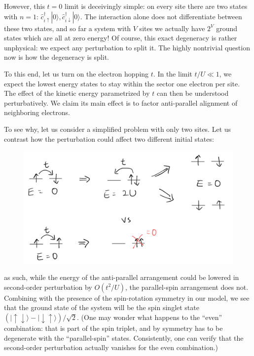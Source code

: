 However, this $t=0$ limit is deceivingly simple: on every site there are two states with $n=1$: $\hat{c}_{i\uparrow}^{\dagger}|0\rangle ,\hat{c}_{i\downarrow}^{\dagger}|0\rangle$. The interaction alone does not differentiate between these two states, and so far a system with $V$ sites we actually have $2^V$ ground states which are all at zero energy! Of course, this exact degeneracy is rather unphysical: we expect any perturbation to split it. The highly nontrivial question now is how the degeneracy is split.

To this end, let us turn on the electron hopping $t$. In the limit $t/U\ll 1$, we expect the lowest energy states to stay within the sector one electron per site. The effect of the kinetic energy parametrized by $t$ can then be understood perturbatively. We claim its main effect is to factor anti-parallel alignment of neighboring electrons.

To see why, let us consider a simplified problem with only two sites. Let us contrast how the perturbation could affect two different initial states:
\begin{figure}[H]
    \centering
    \includegraphics[width=\textwidth]{jupyterbook/data/fig/lec25-fig03.png}
\end{figure}
as such, while the energy of the anti-parallel arrangement could be lowered in second-order perturbation by $O(t^2/U)$, the parallel-spin arrangement does not. Combining with the presence of the spin-rotation symmetry in our model, we see that the ground state of the system will be the spin singlet state $\left( |\uparrow \downarrow \rangle -|\downarrow \uparrow \rangle \right) /\sqrt{2}$. (One may wonder what happens to the ``even'' combination: that is part of the spin triplet, and by symmetry has to be degenerate with the ``parallel-spin'' states. Consistently, one can verify that the second-order perturbation actually vanishes for the even combination.)

